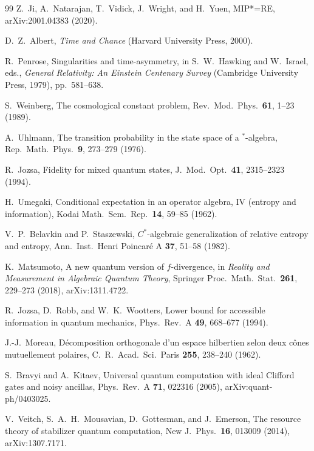 \documentclass[aps,pra,onecolumn,superscriptaddress,nofootinbib,10pt]{revtex4-2}
\theoremstyle{definition}
\theoremstyle{remark}
\begin{document}
\begin{thebibliography}{99}
 Z.~Ji, A.~Natarajan, T.~Vidick, J.~Wright, and H.~Yuen, MIP*=RE, arXiv:2001.04383 (2020).

 D.~Z.~Albert, \emph{Time and Chance} (Harvard University Press, 2000).

 R.~Penrose, Singularities and time-asymmetry, in S.~W.~Hawking and W.~Israel, eds., \emph{General Relativity: An Einstein Centenary Survey} (Cambridge University Press, 1979), pp.~581--638.

 S.~Weinberg, The cosmological constant problem, Rev.\ Mod.\ Phys.\ \textbf{61}, 1--23 (1989).

 A.~Uhlmann, The transition probability in the state space of a $^*$-algebra, Rep.\ Math.\ Phys.\ \textbf{9}, 273--279 (1976).

 R.~Jozsa, Fidelity for mixed quantum states, J.\ Mod.\ Opt.\ \textbf{41}, 2315--2323 (1994).

 H.~Umegaki, Conditional expectation in an operator algebra, IV (entropy and information), Kodai Math.\ Sem.\ Rep.\ \textbf{14}, 59--85 (1962).

 V.~P.~Belavkin and P.~Staszewski, $C^*$-algebraic generalization of relative entropy and entropy, Ann.\ Inst.\ Henri Poincar\'e A \textbf{37}, 51--58 (1982).

 K.~Matsumoto, A new quantum version of $f$-divergence, in \emph{Reality and Measurement in Algebraic Quantum Theory}, Springer Proc.\ Math.\ Stat.\ \textbf{261}, 229--273 (2018), arXiv:1311.4722.

 R.~Jozsa, D.~Robb, and W.~K.~Wootters, Lower bound for accessible information in quantum mechanics, Phys.\ Rev.\ A \textbf{49}, 668--677 (1994).

 J.-J.~Moreau, D\'ecomposition orthogonale d'un espace hilbertien selon deux c\^ones mutuellement polaires, C.\ R.\ Acad.\ Sci.\ Paris \textbf{255}, 238--240 (1962).

 S.~Bravyi and A.~Kitaev, Universal quantum computation with ideal Clifford gates and noisy ancillas, Phys.\ Rev.\ A \textbf{71}, 022316 (2005), arXiv:quant-ph/0403025.

 V.~Veitch, S.~A.~H.~Mousavian, D.~Gottesman, and J.~Emerson, The resource theory of stabilizer quantum computation, New J.\ Phys.\ \textbf{16}, 013009 (2014), arXiv:1307.7171.


\end{thebibliography}
\end{document}
